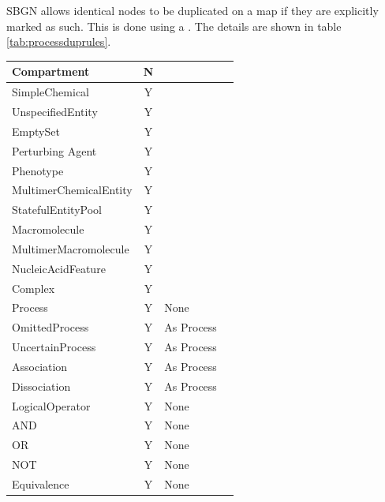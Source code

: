 SBGN allows identical nodes to be duplicated on a map if they are
explicitly marked as such. This is done using a . The details are shown in table \ref{tab:processduprules}.


\begin{center}
\label{tab:processduprules}
\begin{footnotesize}
\tablelasttail{\hline}
\begin{supertabular}{|l|c|p{4cm}|p{3.5cm}|}\hline
Compartment   & N & & \\\hline
SimpleChemical & Y &  & \\\hline
UnspecifiedEntity & Y &  & \\\hline
EmptySet & Y & & \\\hline
Perturbing Agent & Y &  & \\\hline
Phenotype & Y &  & \\\hline
MultimerChemicalEntity & Y &  & \\\hline
StatefulEntityPool & Y &  & \\\hline
Macromolecule & Y &  & \\\hline
MultimerMacromolecule & Y &  & \\\hline
Nucleic\-Acid\-Feature & Y &  & \\\hline
Complex & Y &  & \\\hline
Process & Y & None & \\\hline
OmittedProcess & Y & As Process  & \\\hline
UncertainProcess & Y & As Process  & \\\hline
Association & Y & As Process  & \\\hline
Dissociation & Y & As Process  & \\\hline
LogicalOperator & Y & None & \\\hline
AND & Y & None & \\\hline
OR & Y & None & \\\hline
NOT & Y & None & \\\hline
Equivalence & Y & None & \\\hline
\end{supertabular}
\end{footnotesize}
\end{center}


